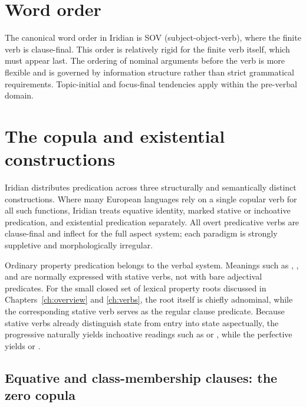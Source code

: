 
\section{Word order}\label{sec:word-order}

The canonical word order in Iridian is SOV (subject-object-verb), where the finite verb is clause-final. This order is relatively rigid for the finite verb itself, which must appear last. The ordering of nominal arguments before the verb is more flexible and is governed by information structure rather than strict grammatical requirements. Topic-initial and focus-final tendencies apply within the pre-verbal domain.


\section{The copula and existential constructions}\label{sec:copula}

Iridian distributes predication across three structurally and semantically distinct constructions. Where many European languages rely on a single copular verb for all such functions, Iridian treats equative identity, marked stative or inchoative predication, and existential predication separately. All overt predicative verbs are clause-final and inflect for the full aspect system; each paradigm is strongly suppletive and morphologically irregular.

Ordinary property predication belongs to the verbal system. Meanings such as
, , and  are normally expressed
with stative verbs, not with bare adjectival predicates. For the small closed
set of lexical property roots discussed in Chapters~\ref{ch:overview} and
\ref{ch:verbs}, the root itself is chiefly adnominal, while the corresponding
stative verb serves as the regular clause predicate. Because stative verbs
already distinguish state from entry into state aspectually, the progressive
naturally yields inchoative readings such as  or
, while the perfective yields  or
.

\subsection{Equative and class-membership clauses: the zero copula}\label{sec:zero-copula}

